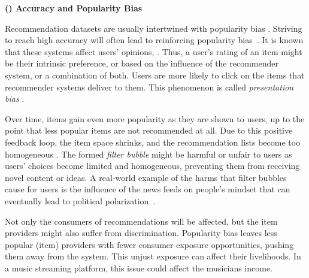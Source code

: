 

\vspace{0.25cm}
\noindent \textbf{() Accuracy and Popularity Bias}
\vspace{0.25cm}

Recommendation datasets are usually intertwined with popularity bias \cite{celma2008hits,lee2014fairness}. Striving to reach high accuracy will often lead to reinforcing popularity bias~\cite{barocas2016big}. It is known that these systems affect users’ opinions, \cite{Cosley2003Influence}. Thus, a user’s rating of an item might be their intrinsic preference, or based on the influence of the recommender system, or a combination of both. Users are more likely to click on the items that recommender systems deliver to them. This phenomenon is called \textit{presentation bias} \cite{baeza2018bias}.

Over time, items gain even more popularity as they are shown to users, up to the point that less popular items are not recommended at all. Due to this positive feedback loop, the item space shrinks, and the recommendation lists become too homogeneous \cite{Chaney2018Homogeneity}. The formed \textit{filter bubble} might be harmful or unfair to users as users' choices become limited and homogeneous, preventing them from receiving novel content or ideas. A real-world example of the harms that filter bubbles cause for users is the influence of the news feeds on people's mindset that can eventually lead to political polarization~\cite{HONG2016777}.


Not only the consumers of recommendations will be affected, but the item providers might also suffer from discrimination. Popularity bias leaves less popular (item) providers with fewer consumer exposure opportunities, pushing them away from the system. This unjust exposure can affect their livelihoods. In a music streaming platform, this issue could affect the musicians income. 

